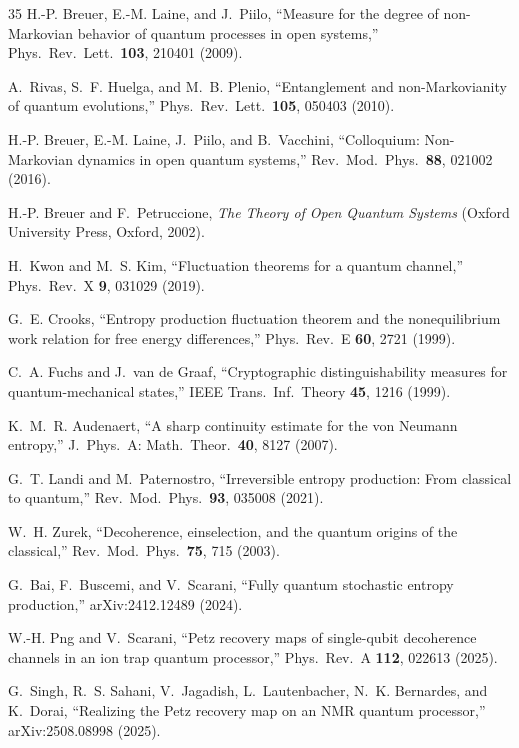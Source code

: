 \documentclass[prl,twocolumn,superscriptaddress,longbibliography]{revtex4-2}
\begin{document}
\begin{thebibliography}{35}
H.-P. Breuer, E.-M. Laine, and J.~Piilo,
``Measure for the degree of non-Markovian behavior of quantum
processes in open systems,''
Phys.\ Rev.\ Lett.\ \textbf{103}, 210401 (2009).

A.~Rivas, S.~F. Huelga, and M.~B. Plenio,
``Entanglement and non-Markovianity of quantum evolutions,''
Phys.\ Rev.\ Lett.\ \textbf{105}, 050403 (2010).

H.-P. Breuer, E.-M. Laine, J.~Piilo, and B.~Vacchini,
``Colloquium: Non-Markovian dynamics in open quantum systems,''
Rev.\ Mod.\ Phys.\ \textbf{88}, 021002 (2016).

H.-P. Breuer and F.~Petruccione,
\emph{The Theory of Open Quantum Systems}
(Oxford University Press, Oxford, 2002).

H.~Kwon and M.~S. Kim,
``Fluctuation theorems for a quantum channel,''
Phys.\ Rev.\ X \textbf{9}, 031029 (2019).

G.~E. Crooks,
``Entropy production fluctuation theorem and the nonequilibrium
work relation for free energy differences,''
Phys.\ Rev.\ E \textbf{60}, 2721 (1999).

C.~A. Fuchs and J.~van de Graaf,
``Cryptographic distinguishability measures for quantum-mechanical
states,''
IEEE Trans.\ Inf.\ Theory \textbf{45}, 1216 (1999).

K.~M.~R. Audenaert,
``A sharp continuity estimate for the von Neumann entropy,''
J.\ Phys.\ A: Math.\ Theor.\ \textbf{40}, 8127 (2007).

G.~T. Landi and M.~Paternostro,
``Irreversible entropy production: From classical to quantum,''
Rev.\ Mod.\ Phys.\ \textbf{93}, 035008 (2021).

W.~H. Zurek,
``Decoherence, einselection, and the quantum origins of the
classical,''
Rev.\ Mod.\ Phys.\ \textbf{75}, 715 (2003).

G.~Bai, F.~Buscemi, and V.~Scarani,
``Fully quantum stochastic entropy production,''
arXiv:2412.12489 (2024).

W.-H. Png and V.~Scarani,
``Petz recovery maps of single-qubit decoherence channels in an
ion trap quantum processor,''
Phys.\ Rev.\ A \textbf{112}, 022613 (2025).

G.~Singh, R.~S. Sahani, V.~Jagadish, L.~Lautenbacher,
N.~K. Bernardes, and K.~Dorai,
``Realizing the Petz recovery map on an NMR quantum processor,''
arXiv:2508.08998 (2025).


\end{thebibliography}
\end{document}
